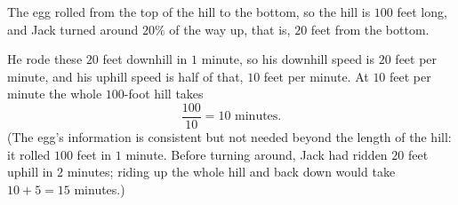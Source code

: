 The egg rolled from the top of the hill to the bottom, so the hill is $100$ feet long, and Jack turned around $20\%$ of the way up, that is, $20$ feet from the bottom.

He rode these $20$ feet downhill in $1$ minute, so his downhill speed is $20$ feet per minute, and his uphill speed is half of that, $10$ feet per minute. At $10$ feet per minute the whole $100$-foot hill takes
\[\dfrac{100}{10}=\boxed{10}\text{ minutes}.\]
(The egg's information is consistent but not needed beyond the length of the hill: it rolled $100$ feet in $1$ minute. Before turning around, Jack had ridden $20$ feet uphill in $2$ minutes; riding up the whole hill and back down would take $10+5=15$ minutes.)
